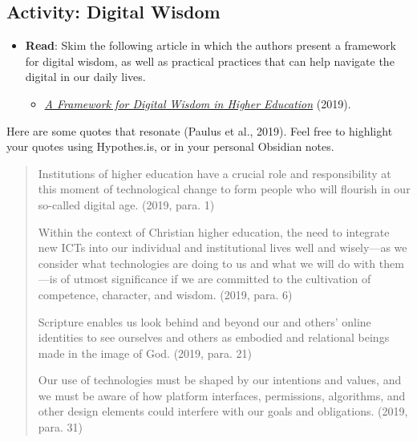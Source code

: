 \documentclass[
  letterpaper,
  DIV=11,
  numbers=noendperiod]{scrreprt}
\providecommand{\tightlist}{%
  \setlength{\itemsep}{0pt}\setlength{\parskip}{0pt}}\usepackage{longtable,booktabs,array}
\begin{document}
\subsection{Activity: Digital Wisdom}\label{activity-digital-wisdom}

\begin{tcolorbox}[enhanced jigsaw, toprule=.15mm, colback=white, colframe=quarto-callout-note-color-frame, bottomtitle=1mm, leftrule=.75mm, coltitle=black, titlerule=0mm, rightrule=.15mm, colbacktitle=quarto-callout-note-color!10!white, left=2mm, title={Learning Activity}, opacitybacktitle=0.6, opacityback=0, breakable, toptitle=1mm, arc=.35mm, bottomrule=.15mm]

\begin{itemize}
\tightlist
\item
  \textbf{Read}: Skim the following article in which the authors present
  a framework for digital wisdom, as well as practical practices that
  can help navigate the digital in our daily lives.

  \begin{itemize}
  \tightlist
  \item
    \href{https://christianscholars.com/a-framework-for-digital-wisdom-in-higher-education/}{\emph{A
    Framework for Digital Wisdom in Higher Education}} (2019).
  \end{itemize}
\end{itemize}

Here are some quotes that resonate (Paulus et al., 2019). Feel free to
highlight your quotes using Hypothes.is, or in your personal Obsidian
notes.

\begin{quote}
Institutions of higher education have a crucial role and responsibility
at this moment of technological change to form people who will flourish
in our so-called digital age. (2019, para. 1)

Within the context of Christian higher education, the need to integrate
new ICTs into our individual and institutional lives well and
wisely---as we consider what technologies are doing to us and what we
will do with them---is of utmost significance if we are committed to the
cultivation of competence, character, and wisdom. (2019, para. 6)

Scripture enables us look behind and beyond our and others' online
identities to see ourselves and others as embodied and relational beings
made in the image of God. (2019, para. 21)

Our use of technologies must be shaped by our intentions and values, and
we must be aware of how platform interfaces, permissions, algorithms,
and other design elements could interfere with our goals and
obligations. (2019, para. 31)
\end{quote}


\end{tcolorbox}
\end{document}
